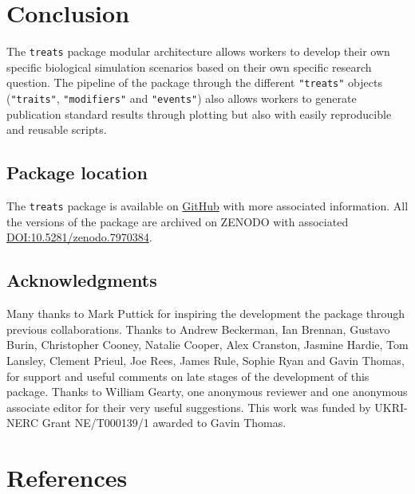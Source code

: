 \documentclass[
]{article}
\begin{document}
\hypertarget{conclusion}{%
\section{Conclusion}\label{conclusion}}

The \texttt{treats} package modular architecture allows workers to
develop their own specific biological simulation scenarios based on
their own specific research question. The pipeline of the package
through the different \texttt{"treats"} objects (\texttt{"traits"},
\texttt{"modifiers"} and \texttt{"events"}) also allows workers to
generate publication standard results through plotting but also with
easily reproducible and reusable scripts.

\hypertarget{package-location}{%
\subsection{Package location}\label{package-location}}

The \texttt{treats} package is available on
\href{https://anonymous.4open.science/r/treats-006B}{GitHub} with more
associated information. All the versions of the package are archived on
ZENODO with associated
\href{https://doi.org/10.5281/zenodo.7970384}{DOI:10.5281/zenodo.7970384}.

\hypertarget{acknowledgments}{%
\subsection{Acknowledgments}\label{acknowledgments}}

Many thanks to Mark Puttick for inspiring the development the package
through previous collaborations. Thanks to Andrew Beckerman, Ian
Brennan, Gustavo Burin, Christopher Cooney, Natalie Cooper, Alex
Cranston, Jasmine Hardie, Tom Lansley, Clement Prieul, Joe Rees, James
Rule, Sophie Ryan and Gavin Thomas, for support and useful comments on
late stages of the development of this package. Thanks to William
Gearty, one anonymous reviewer and one anonymous associate editor for
their very useful suggestions. This work was funded by UKRI-NERC Grant
NE/T000139/1 awarded to Gavin Thomas.

\hypertarget{references}{%
\section*{References}\label{references}}
\end{document}
